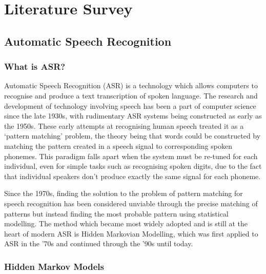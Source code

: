 \chapter{Literature Survey}\label{ch:literature-survey}

\section{Automatic Speech Recognition}\label{sec:what-is-asr}

\subsection{What is ASR?}

Automatic Speech Recognition (ASR) is a technology which allows computers to recognise and produce a text transcription of spoken language.
The research and development of technology involving speech has been a part of computer science since the late 1930s\cite{Rabiner2004Jan,vocoder}, with rudimentary ASR systems being constructed as early as the 1950s\cite{asr-52}.
These early attempts at recognising human speech treated it as a `pattern matching' problem, the theory being that words could be constructed by matching the pattern created in a speech signal to corresponding spoken phonemes\cite{Rabiner2004Jan}. 
This paradigm falls apart when the system must be re-tuned for each individual, even for simple tasks such as recognising spoken digits\cite{asr-52}, due to the fact that individual speakers don't produce exactly the same signal for each phoneme\cite{Horton2010}.

Since the 1970s, finding the solution to the problem of pattern matching for speech recognition has been considered unviable through the precise matching of patterns but instead finding the most probable pattern using statistical modelling\cite{Rabiner2004Jan}.
The method which became most widely adopted and is still at the heart of modern ASR is Hidden Markovian Modelling, which was first applied to ASR in the '70s\cite{baker1975stochastic} and continued through the '90s\cite{bengio1999markovian} until today\cite{hmm2023}.

\subsection{Hidden Markov Models}

